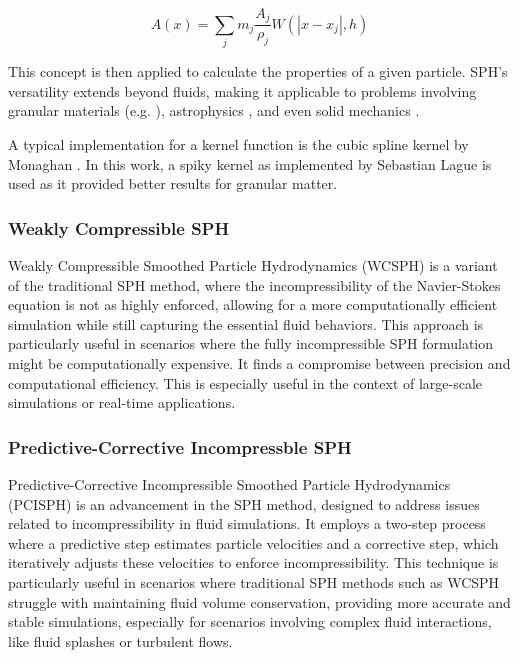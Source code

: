 \documentclass[intern]{cgMA}
\begin{document}
    \begin{equation}
        A(x) = \sum_j m_j \frac{A_j}{\rho_j} W(|x - x_j|, h)
    \end{equation}

    This concept is then applied to calculate the properties of a given particle. SPH's versatility extends beyond fluids, making it applicable to problems involving granular materials (e.g. \cite{10.2312:LocalChapterEvents:CEIG:CEIG09:011-018}), astrophysics \cite{Springel_2010}, and even solid mechanics \cite{solid_mechanics}. 

    A typical implementation for a kernel function is the cubic spline kernel by Monaghan \cite{doi:10.1146/annurev.aa.30.090192.002551}. In this work, a spiky kernel as implemented by Sebastian Lague \cite{seblague} is used as it provided better results for granular matter.

    \subsubsection*{Weakly Compressible SPH}
    Weakly Compressible Smoothed Particle Hydrodynamics (WCSPH) is a variant of the traditional SPH method, where the incompressibility of the Navier-Stokes equation is not as highly enforced, allowing for a more computationally efficient simulation while still capturing the essential fluid behaviors. This approach is particularly useful in scenarios where the fully incompressible SPH formulation might be computationally expensive. It finds a compromise between precision and computational efficiency. This is especially useful in the context of large-scale simulations or real-time applications.\cite{wcsph}

    \subsubsection*{Predictive-Corrective Incompressble SPH} 
    Predictive-Corrective Incompressible Smoothed Particle Hydrodynamics (PCISPH) is an advancement in the SPH method, designed to address issues related to incompressibility in fluid simulations. It employs a two-step process where a predictive step estimates particle velocities and a corrective step, which iteratively adjusts these velocities to enforce incompressibility. This technique is particularly useful in scenarios where traditional SPH methods such as WCSPH struggle with maintaining fluid volume conservation, providing more accurate and stable simulations, especially for scenarios involving complex fluid interactions, like fluid splashes or turbulent flows. \cite{10.1145/1576246.1531346}
\end{document}
